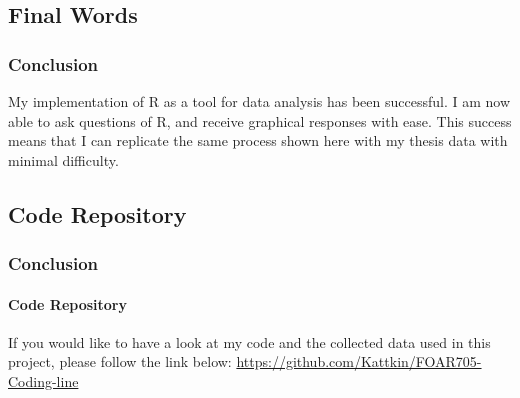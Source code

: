 \documentclass[aspectratio=1610]{beamer}
\begin{document}
\subsection{Final Words}
\begin{frame}
\frametitle{Conclusion}
My implementation of R as a tool for data analysis has been successful.
\newline 
I am now able to ask questions of R, and receive graphical responses with ease.
\newline 
This success means that I can replicate the same process shown here with my thesis data with minimal difficulty.
\end{frame}
\subsection{Code Repository}
\begin{frame}
\frametitle{Conclusion}
\framesubtitle{Code Repository}
If you would like to have a look at my code and the collected data used in this project, please follow the link below:
\newline
\newline
\url{https://github.com/Kattkin/FOAR705-Coding-line}
\end{frame}
\end{document}
